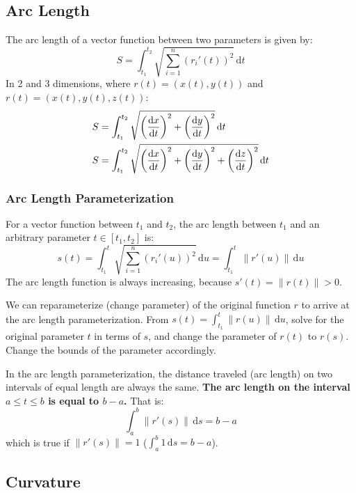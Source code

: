 \documentclass{article}
\begin{document}
\subsection{Arc Length}

The arc length of a vector function between two parameters is given by:
\begin{equation*}
    S=\int_{t_1}^{t_2}\sqrt{\sum_{i=1}^{n}(r_i'(t))^2}\,\mathrm{d}t
\end{equation*}
In 2 and 3 dimensions, where $r(t)=(x(t),y(t))$ and $r(t)=(x(t),y(t),z(t))$:
\begin{align*}
	S&=\int_{t_1}^{t_2}\sqrt{\left( \diff xt \right)^2+\left(\diff yt\right)^2}\,\mathrm{d}t \\
	S&=\int_{t_1}^{t_2}\sqrt{\left(\diff xt\right)^2+\left(\diff yt\right)^2+\left(\diff zt\right)^2}\,\mathrm{d}t
\end{align*}

\subsubsection{Arc Length Parameterization}

For a vector function between $t_1$ and $t_2$, the arc length between $t_1$ and an arbitrary parameter $t\in[t_1,t_2]$ is:
\begin{equation*}
    s(t)=\int_{t_1}^{t}\sqrt{\sum_{i=1}^{n}(r_i'(u))^2}\,\mathrm{d}u
	=\int_{t_1}^{t}\lVert r'(u) \rVert \,\mathrm{d}u
\end{equation*}
The arc length function is always increasing, because $s'(t)=\lVert r(t) \rVert >0$.

We can reparameterize (change parameter) of the original function $r$ to arrive at the arc length parameterization. From $s(t)=\int_{t_1}^{t}\lVert r(u) \rVert \,\mathrm{d}u$, solve for the original parameter $t$ in terms of $s$, and change the parameter of $r(t)$ to $r(s)$. Change the bounds of the parameter accordingly.

In the arc length parameterization, the distance traveled (arc length) on two intervals of equal length are always the same. \textbf{The arc length on the interval $a\leq t\leq b$ is equal to $b-a$.} That is:
\begin{equation*}
    \int_{a}^{b}\lVert r'(s) \rVert \,\mathrm{d}s
	=b-a
\end{equation*}
which is true if $\lVert r'(s) \rVert =1$ ($\int_{a}^{b}1\,\mathrm{d}s=b-a$).

\subsection{Curvature}
\end{document}
